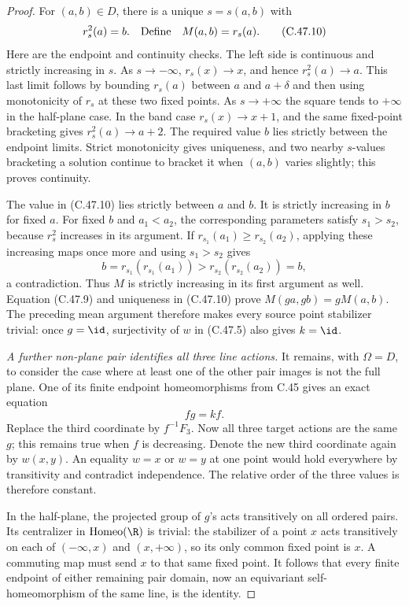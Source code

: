 \begin{proof}
For $(a,b)\in D$, there is a unique $s=s(a,b)$ with
\[
                   r_s^2(a)=b.
 \quad\hbox{Define}\quad M(a,b)=r_s(a).                  \tag{C.47.10}
\]
Here are the endpoint and continuity checks. The left side is
continuous and strictly increasing in $s$.
As $s\to-\infty$, $r_s(x)\to x$, and hence $r_s^2(a)\to a$.
This last limit follows by bounding $r_s(a)$ between $a$ and
$a+\delta$ and then using monotonicity of $r_s$ at these two
fixed points. As $s\to+\infty$ the square tends to $+\infty$
in the half-plane case. In the band case $r_s(x)\to x+1$,
and the same fixed-point bracketing gives
$r_s^2(a)\to a+2$. The required value $b$ lies strictly between
the endpoint limits. Strict monotonicity gives uniqueness,
and two nearby $s$-values bracketing a solution continue to
bracket it when $(a,b)$ varies slightly; this proves continuity.

The value in (C.47.10) lies strictly between $a$ and $b$.
It is strictly increasing in $b$ for fixed $a$.
For fixed $b$ and $a_1<a_2$, the corresponding parameters satisfy
$s_1>s_2$, because $r_s^2$ increases in its argument.
If $r_{s_1}(a_1)\geq r_{s_2}(a_2)$, applying these increasing
maps once more and using $s_1>s_2$ gives
\[
 b=r_{s_1}(r_{s_1}(a_1))
   >r_{s_2}(r_{s_2}(a_2))=b,
 \]
a contradiction. Thus $M$ is strictly increasing in its first
argument as well.
Equation (C.47.9) and uniqueness in (C.47.10) prove
$M(ga,gb)=gM(a,b)$.
The preceding mean argument therefore makes every source
point stabilizer trivial: once $g=\id$, surjectivity of $w$
in (C.47.5) also gives $k=\id$.

\emph{A further non-plane pair identifies all three line actions.}
It remains, with $\Omega=D$, to consider the case where at least
one of the other pair images is not the full plane. One of its
finite endpoint homeomorphisms from C.45 gives an exact equation
\[
                         f g=k f.                       \tag{C.47.11}
\]
Replace the third coordinate by $f^{-1}F_3$.
Now all three target actions are the same $g$; this remains true
when $f$ is decreasing. Denote the new third coordinate again
by $w(x,y)$. An equality $w=x$ or $w=y$ at one point would
hold everywhere by transitivity and contradict independence.
The relative order of the three values is therefore constant.

In the half-plane, the projected group of $g$'s acts transitively
on all ordered pairs. Its centralizer in
$\operatorname{Homeo}(\R)$ is trivial: the stabilizer of a point
$x$ acts transitively on each of $(-\infty,x)$ and $(x,+\infty)$,
so its only common fixed point is $x$.
A commuting map must send $x$ to that same fixed point.
It follows that every finite endpoint of either remaining
pair domain, now an equivariant self-homeomorphism of the
same line, is the identity.


\end{proof}
